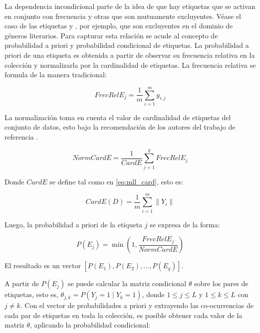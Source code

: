 La dependencia incondicional parte de la idea de que hay etiquetas que se
activan en conjunto con frecuencia y otras que son mutuamente excluyentes. Véase
el caso de las etiquetas  y , por ejemplo, que son excluyentes en el dominio de géneros literarios.
Para capturar esta relación se acude al concepto de probabilidad a priori y
probabilidad condicional de etiquetas. La probabilidad a priori de una etiqueta
es obtenida a partir de observar su frecuencia relativa en la colección y
normalizarla por la cardinalidad de etiquetas. La frecuencia relativa se formula
de la manera tradicional:

\begin{equation}
	FrecRelE_{j} = \frac{1}{m} \sum_{i=1}^{m} y_{i,j}
\end{equation}

La normalización toma en cuenta el valor de cardinalidad de etiquetas del
conjunto de datos, esto bajo la recomendación de los autores del trabajo de
referencia \cite{read_scalable_2012}.

\begin{equation}
	NormCardE = \frac{1}{CardE} \sum_{j=1}^{q} FrecRelE_{j}
\end{equation}

Donde $CardE$ se define tal como en \ref{eq:mll_card}, esto es:

\begin{equation}
	CardE(D) = \frac{1}{m} \sum_{i=1}^{m} \left\|Y_{i}\right\|
\end{equation}

Luego, la probabilidad a priori de la etiqueta $j$ se expresa de la forma:

\begin{equation}
	P(E_{j}) =\min{(1, \frac{FrecRelE_{j}}{NormCardE})}
\end{equation}

El resultado es un vector $[P(E_{1}), P(E_{2}),\dots, P(E_{q})]$.

A partir de $P(E_{j})$ se puede calcular la matriz condicional $\theta$ sobre
los pares de etiquetas, esto es, $\theta_{j,k} = P(Y_{j} = 1 \mid Y_{k} = 1)$,
donde  $1 \leq j \leq L$ y $1 \leq k \leq L$ con $j \neq k$.  Con el vector de probabilidades a priori y extrayendo las
co-ocurrencias de cada par de etiquetas en toda la colección, es posible obtener
cada valor de la matriz $\theta$, aplicando la probabilidad condicional:

